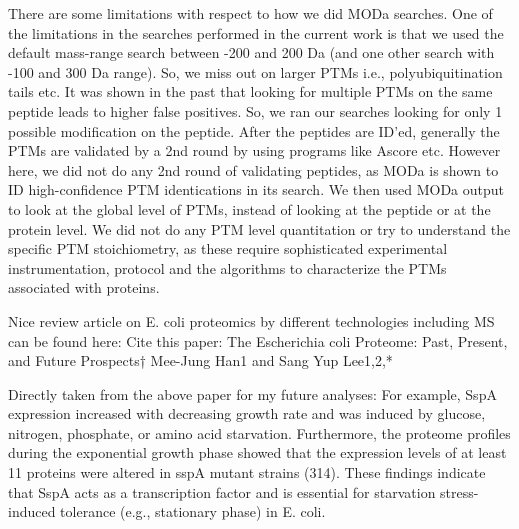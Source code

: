 \documentclass[12pt]{article}
\begin{document}
There are some limitations with respect to how we did MODa searches. One of the limitations in the searches performed in the current work is that we used the default mass-range search between -200 and 200 Da (and one other search with -100 and 300 Da range). So, we miss out on larger PTMs i.e., polyubiquitination tails etc. It was shown in the past that looking for multiple PTMs on the same peptide leads to higher false positives. So, we ran our searches looking for only 1 possible modification on the peptide. After the peptides are ID'ed, generally the PTMs are validated by a 2nd round by using programs like Ascore etc. However here, we did not do any 2nd round of validating peptides, as MODa is shown to ID high-confidence PTM identications in its search. We then used MODa output to look at the global level of PTMs, instead of looking at the peptide or at the protein level. We did not do any PTM level quantitation or try to understand the specific PTM stoichiometry, as these require sophisticated experimental instrumentation, protocol and the algorithms to characterize the PTMs associated with proteins.

Nice review article on E. coli proteomics by different technologies including MS can be found here:
Cite this paper: The Escherichia coli Proteome: Past, Present, and Future Prospects†
Mee-Jung Han1 and Sang Yup Lee1,2,*

Directly taken from the above paper for my future analyses: For example, SspA expression increased with decreasing growth rate and was induced by glucose, nitrogen, phosphate, or amino acid starvation. Furthermore, the proteome profiles during the exponential growth phase showed that the expression levels of at least 11 proteins were altered in sspA mutant strains (314). These findings indicate that SspA acts as a transcription factor and is essential for starvation stress-induced tolerance (e.g., stationary phase) in E. coli.
\end{document}
